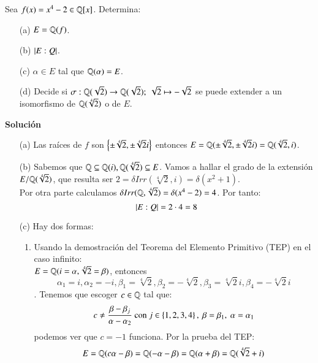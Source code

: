 \begin{ex}
    Sea $f(x) = x^4 - 2 \in \mathbb{Q}[x]$. Determina:
    \begin{itemize}
        \item[(a)] $E=\mathbb{Q}(f)$.
        \item[(b)] $\left|E:Q\right|$.
        \item[(c)] $\alpha \in E$ tal que $\mathbb{Q}(\alpha) = E$.
        \item[(d)] Decide si $\sigma: \mathbb{Q}(\sqrt 2) \to \mathbb{Q}(\sqrt 2);\ \sqrt{2} \mapsto -\sqrt{2}$ se puede extender a un isomorfismo de $\mathbb{Q}(\sqrt[4]{2})$ o de $E$.
    \end{itemize}

    \textbf{Solución}\\
    \begin{itemize}
        \item[(a)] Las raíces de $f$ son $\left\{\pm \sqrt[4]{2}, \pm \sqrt[4]{2}i\right\}$ entonces $E = \mathbb{Q}(\pm \sqrt[4]{2}, \pm \sqrt[4]{2}i) = \mathbb{Q}(\sqrt[4]{2}, i)$.
        \item[(b)] Sabemos que $\mathbb{Q} \subseteq \mathbb{Q}(i), \mathbb{Q}(\sqrt[4]{2}) \subseteq E$. Vamos a hallar el grado de la extensión $E/\mathbb{Q}(\sqrt[4]{2})$, que resulta ser $2 = \delta Irr(\sqrt[4]{2}, i) = \delta(x^2 + 1)$.\\
        Por otra parte calculamos $\delta Irr(\mathbb{Q}, \sqrt[4]{2}) = \delta(x^4-2) = 4$. Por tanto:
        $$
            \left|E:Q\right| = 2 \cdot 4 = 8
        $$
        \item[(c)] Hay dos formas:\\
            \begin{enumerate}
                \item Usando la demostración del Teorema del Elemento Primitivo (TEP) en el caso infinito:\\
                $E = \mathbb{Q}(i = \alpha, \sqrt[4]{2} = \beta)$, entonces $$\alpha_1 = i, \alpha_2 = -i, \beta_1 = \sqrt[4]{2}, \beta_2 = -\sqrt[4]{2}, \beta_3 = \sqrt[4]{2}i, \beta_4 = -\sqrt[4]{2}i$$.
                Tenemos que escoger $c \in \mathbb{Q}$ tal que:
                $$
                    c \neq \frac{\beta - \beta_j}{\alpha-\alpha_2} \text{ con } j \in \left\{1, 2, 3, 4\right\},\ \beta = \beta_1,\ \alpha = \alpha_1
                $$
                podemos ver que $c = -1$ funciona. Por la prueba del TEP: $$E = \mathbb{Q}(c\alpha - \beta) = \mathbb{Q}(-\alpha - \beta) = \mathbb{Q}(\alpha + \beta) = \mathbb{Q}(\sqrt[4]{2} + i)$$


\end{enumerate}
\end{itemize}
\end{ex}
